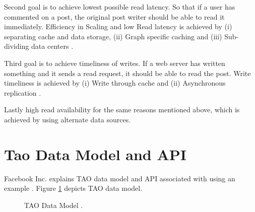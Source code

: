 \documentclass[9pt,twocolumn,twoside]{../../styles/osajnl}
\begin{document}
Second goal is to achieve lowest possible read latency. So that if a user has commented on a post, the original post writer should be able to read it immediately.
Efficiency in Scaling and low Read latency is achieved by (i) separating cache and data storage, (ii) Graph specific caching and (iii) Sub-dividing data centers \cite{www-tao4}.

Third goal is to achieve timeliness of writes. If a web server has written something and it sends a read request, it should be able to read the post. Write timeliness is achieved by (i) Write through cache and (ii) Asynchronous replication \cite{www-tao4}.

Lastly \TODO{,} high read availability for the same reasons mentioned above, which is achieved by using alternate data sources. 


\section{Tao Data Model and API}
Facebook Inc. explains TAO data model and API associated with using an example \cite{www-tao2}. Figure \ref{fig:figure1} depicts TAO data model.

\begin{figure}[htbp]
\centering
{}
\caption{TAO Data Model \cite{www-tao2}.}
\label{fig:figure1}
\end{figure}
\end{document}
